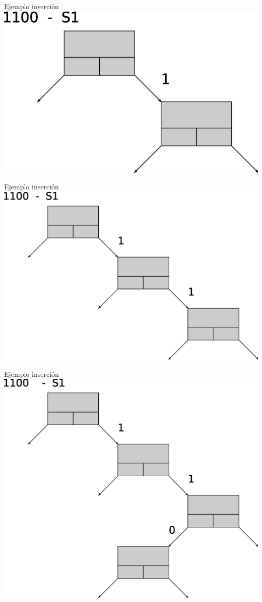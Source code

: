 \documentclass[xcolor=dvipsnames]{beamer}
\begin{document}
\begin{frame}{Ejemplo inserción} 
\center	
\includegraphics[scale=0.30]{figures/lluinsert02.eps} 
\end{frame}

\begin{frame}{Ejemplo inserción} 
\center	
\includegraphics[scale=0.30]{figures/lluinsert03.eps} 
\end{frame}

\begin{frame}{Ejemplo inserción} 
\center	
\includegraphics[scale=0.30]{figures/lluinsert04.eps} 
\end{frame}
\end{document}
